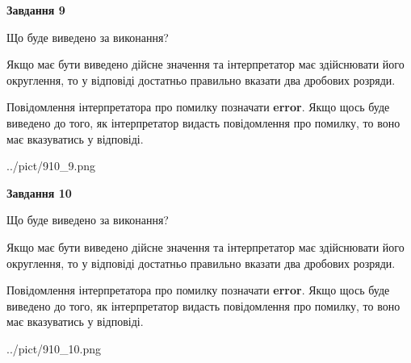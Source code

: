 \documentclass[12pt, ukrainian]{article}
\begin{document}
{\begin {Large}
{\begin {center}\textbf{Завдання 9}\end {center}}\par
Що буде виведено за виконання? \par

Якщо має бути виведено дійсне значення та інтерпретатор має здійснювати його округлення, 
то у відповіді достатньо правильно вказати два дробових розряди.

Повідомлення інтерпретатора про помилку позначати \textbf{error}.
Якщо щось буде виведено до того, як інтерпретатор видасть повідомлення про помилку, 
то воно має вказуватись у відповіді. \par

\begin{center}
	{../pict/910_9.png}
\end{center}
\newpage

{\begin {center}\textbf{Завдання 10}\end {center}}\par
Що буде виведено за виконання? \par

Якщо має бути виведено дійсне значення та інтерпретатор має здійснювати його округлення, 
то у відповіді достатньо правильно вказати два дробових розряди.

Повідомлення інтерпретатора про помилку позначати \textbf{error}.
Якщо щось буде виведено до того, як інтерпретатор видасть повідомлення про помилку, 
то воно має вказуватись у відповіді. \par

\begin{center}
	{../pict/910_10.png}
\end{center}
\newpage

\end {Large}}
\end{document}
